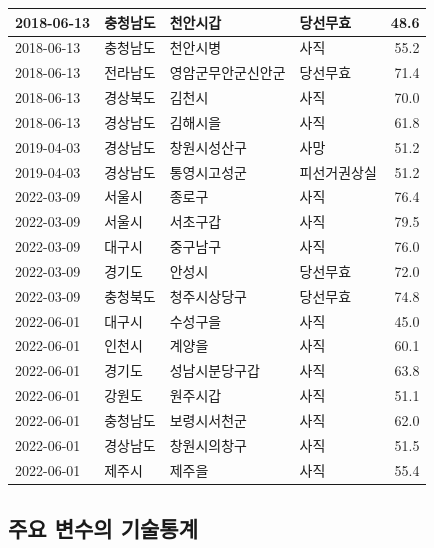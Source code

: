 \documentclass[
  11pt,
  letter]{article}
\begin{document}
\begin{longtable}[t]{l|l|l|l|r}
\hline
2018-06-13 & 충청남도 & 천안시갑 & 당선무효 & 48.6\\
\hline
2018-06-13 & 충청남도 & 천안시병 & 사직 & 55.2\\
\hline
2018-06-13 & 전라남도 & 영암군무안군신안군 & 당선무효 & 71.4\\
\hline
2018-06-13 & 경상북도 & 김천시 & 사직 & 70.0\\
\hline
2018-06-13 & 경상남도 & 김해시을 & 사직 & 61.8\\
\hline
2019-04-03 & 경상남도 & 창원시성산구 & 사망 & 51.2\\
\hline
2019-04-03 & 경상남도 & 통영시고성군 & 피선거권상실 & 51.2\\
\hline
2022-03-09 & 서울시 & 종로구 & 사직 & 76.4\\
\hline
2022-03-09 & 서울시 & 서초구갑 & 사직 & 79.5\\
\hline
2022-03-09 & 대구시 & 중구남구 & 사직 & 76.0\\
\hline
2022-03-09 & 경기도 & 안성시 & 당선무효 & 72.0\\
\hline
2022-03-09 & 충청북도 & 청주시상당구 & 당선무효 & 74.8\\
\hline
2022-06-01 & 대구시 & 수성구을 & 사직 & 45.0\\
\hline
2022-06-01 & 인천시 & 계양을 & 사직 & 60.1\\
\hline
2022-06-01 & 경기도 & 성남시분당구갑 & 사직 & 63.8\\
\hline
2022-06-01 & 강원도 & 원주시갑 & 사직 & 51.1\\
\hline
2022-06-01 & 충청남도 & 보령시서천군 & 사직 & 62.0\\
\hline
2022-06-01 & 경상남도 & 창원시의창구 & 사직 & 51.5\\
\hline
2022-06-01 & 제주시 & 제주을 & 사직 & 55.4\\
\hline
\end{longtable}

\newpage

\hypertarget{uxc8fcuxc694-uxbcc0uxc218uxc758-uxae30uxc220uxd1b5uxacc4}{%
\subsection{주요 변수의
기술통계}\label{uxc8fcuxc694-uxbcc0uxc218uxc758-uxae30uxc220uxd1b5uxacc4}}
\end{document}
